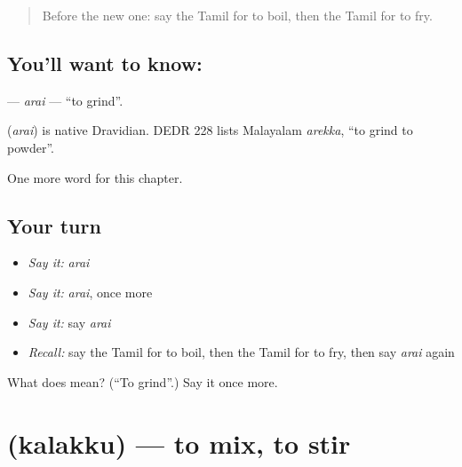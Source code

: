 \label{lesson:TA-C161-arai}



\begin{quote}
Before the new one: say the Tamil for to boil, then the Tamil for to fry.
\end{quote}

\subsection*{You'll want to know: }
\textbf{} — \emph{arai} — \textquotedblleft{}to grind\textquotedblright{}.

\begin{cousinweb}
\textbf{} (\emph{arai}) is native Dravidian. DEDR 228 lists Malayalam \emph{arekka}, \textquotedblleft{}to grind to powder\textquotedblright{}.
\end{cousinweb}

\begin{grammarlens}[title={What you've built}]
One more word for this chapter.
\end{grammarlens}

\subsection*{Your turn}
\begin{itemize}
\raggedright
  \item \emph{Say it:} \emph{arai}
  \item \emph{Say it:} \emph{arai}, once more
  \item \emph{Say it:} say \emph{arai}
  \item \emph{Recall:} say the Tamil for to boil, then the Tamil for to fry, then say \emph{arai} again
\end{itemize}

\begin{tcolorbox}[breakable,colback=teal!4,colframe=teal!35!black,title={Before you move on}]
What does  mean? (\textquotedblleft{}To grind\textquotedblright{}.) Say it once more.
\end{tcolorbox}
\section[\texorpdfstring{\ta{கலக்கு} (kalakku)}{கலக்கு (kalakku)}]{ (kalakku) — to mix, to stir}

\label{lesson:TA-C161-kalakku}



